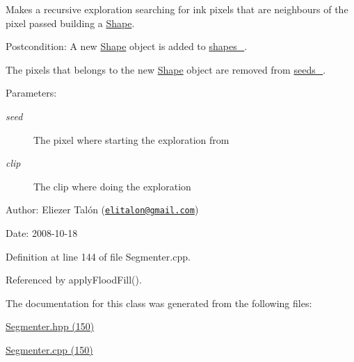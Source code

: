 Makes a recursive exploration searching for ink pixels that are neighbours of the pixel passed building a \hyperlink{class_shape}{Shape}. 

\begin{Desc}
\item[Postcondition:]A new \hyperlink{class_shape}{Shape} object is added to \hyperlink{class_segmenter_3040cc000907ef44e820ddcf70de6f08}{shapes\_\-}. 

The pixels that belongs to the new \hyperlink{class_shape}{Shape} object are removed from \hyperlink{class_segmenter_48b7c2c842b26bebda9d0fc13cf81e58}{seeds\_\-}.\end{Desc}
\begin{Desc}
\item[Parameters:]
\begin{description}
\item[{\em seed}]The pixel where starting the exploration from \item[{\em clip}]The clip where doing the exploration\end{description}
\end{Desc}
\begin{Desc}
\item[Author:]Eliezer Talón (\href{mailto:elitalon@gmail.com}{\tt elitalon@gmail.com}) \end{Desc}
\begin{Desc}
\item[Date:]2008-10-18 \end{Desc}


Definition at line 144 of file Segmenter.cpp.

Referenced by applyFloodFill().

The documentation for this class was generated from the following files:\begin{CompactItemize}
\item 
\hyperlink{_segmenter_8hpp}{Segmenter.hpp (150)}\item 
\hyperlink{_segmenter_8cpp}{Segmenter.cpp (150)}\end{CompactItemize}
